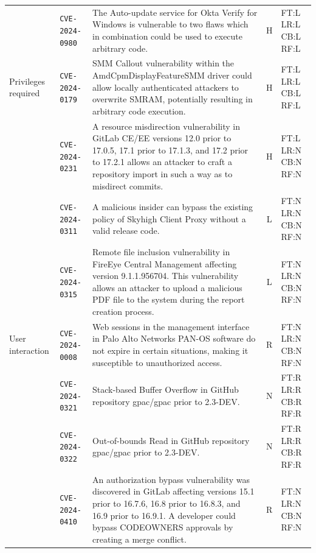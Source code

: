 \begin{table}[p]
\begin{tabular}{@{}llp{6.2cm}cl@{}}
 & \texttt{CVE-2024-0980} & The Auto-update service for Okta Verify for Windows is vulnerable to two flaws which in combination could be used to execute arbitrary code. & H & FT:L LR:L CB:L RF:L \\
\addlinespace[3pt]
Privileges required & \texttt{CVE-2024-0179} & SMM Callout vulnerability within the AmdCpmDisplayFeatureSMM driver could allow locally authenticated attackers to overwrite SMRAM, potentially resulting in arbitrary code execution. & H & FT:L LR:L CB:L RF:L \\
 & \texttt{CVE-2024-0231} & A resource misdirection vulnerability in GitLab CE/EE versions 12.0 prior to 17.0.5, 17.1 prior to 17.1.3, and 17.2 prior to 17.2.1 allows an attacker to craft a repository import in such a way as to misdirect commits. & H & FT:L LR:N CB:N RF:N \\
 & \texttt{CVE-2024-0311} & A malicious insider can bypass the existing policy of Skyhigh Client Proxy without a valid release code. & L & FT:N LR:N CB:N RF:N \\
 & \texttt{CVE-2024-0315} & Remote file inclusion vulnerability in FireEye Central Management affecting version 9.1.1.956704. This vulnerability allows an attacker to upload a malicious PDF file to the system during the report creation process. & L & FT:N LR:N CB:N RF:N \\
\addlinespace[3pt]
User interaction & \texttt{CVE-2024-0008} & Web sessions in the management interface in Palo Alto Networks PAN-OS software do not expire in certain situations, making it susceptible to unauthorized access. & R & FT:N LR:N CB:N RF:N \\
 & \texttt{CVE-2024-0321} & Stack-based Buffer Overflow in GitHub repository gpac/gpac prior to 2.3-DEV. & N & FT:R LR:R CB:R RF:R \\
 & \texttt{CVE-2024-0322} & Out-of-bounds Read in GitHub repository gpac/gpac prior to 2.3-DEV. & N & FT:R LR:R CB:R RF:R \\
 & \texttt{CVE-2024-0410} & An authorization bypass vulnerability was discovered in GitLab affecting versions 15.1 prior to 16.7.6, 16.8 prior to 16.8.3, and 16.9 prior to 16.9.1. A developer could bypass CODEOWNERS approvals by creating a merge conflict. & R & FT:N LR:N CB:N RF:N \\
\bottomrule
\end{tabular}
\end{table}
